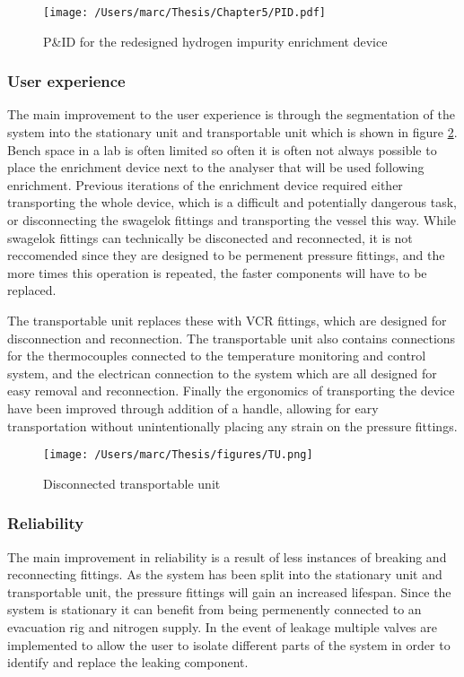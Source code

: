 \begin{landscape}
\begin{figure}
    \centering
    \texttt{[image: /Users/marc/Thesis/Chapter5/PID.pdf]}
    \caption{P\&ID for the redesigned hydrogen impurity enrichment device}
    \label{hiedpid}
\end{figure}
\end{landscape}

\subsubsection*{User experience}
The main improvement to the user experience is through the segmentation of the system into the stationary unit and transportable unit which is shown in figure \ref{TU}. Bench space in a lab is often limited so often it is often not always possible to place the enrichment device next to the analyser that will be used following enrichment. Previous iterations of the enrichment device required either transporting the whole device, which is a difficult and potentially dangerous task, or disconnecting the swagelok fittings and transporting the vessel this way. While swagelok fittings can technically be disconected and reconnected, it is not reccomended since they are designed to be permenent pressure fittings, and the more times this operation is repeated, the faster components will have to be replaced. 

The transportable unit replaces these with VCR fittings, which are designed for disconnection and reconnection. The transportable unit also contains connections for the thermocouples connected to the temperature monitoring and control system, and the electrican connection to the system which are all designed for easy removal and reconnection. Finally the ergonomics of transporting the device have been improved through addition of a handle, allowing for eary transportation without unintentionally placing any strain on the pressure fittings. 
\begin{figure}
    \centering
    \texttt{[image: /Users/marc/Thesis/figures/TU.png]}
    \caption{Disconnected transportable unit}
    \label{TU}
\end{figure}

\subsubsection*{Reliability}
The main improvement in reliability is a result of less instances of breaking and reconnecting fittings. As the system has been split into the stationary unit and transportable unit, the pressure fittings will gain an increased lifespan. Since the system is stationary it can benefit from being permenently connected to an evacuation rig and nitrogen supply. In the event of leakage multiple valves are implemented to allow the user to isolate different parts of the system in order to identify and replace the leaking component.

